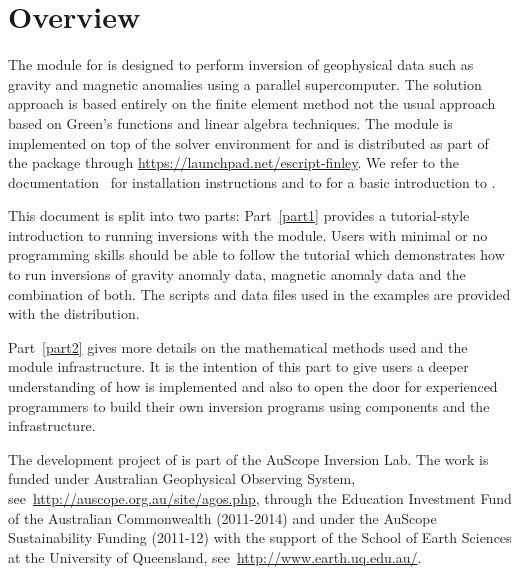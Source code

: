 
%
%
%


\chapter*{Overview}\label{sec:Intro}
The \downunder module for \Python is designed to perform inversion of
geophysical data such as gravity and magnetic anomalies using a parallel
supercomputer.
The solution approach is based entirely on the finite element method not the usual approach based on Green's functions
and linear algebra techniques.
The module is implemented on top of the \escript solver environment for
\Python and is distributed as part of the \escript package through
\url{https://launchpad.net/escript-finley}.
We refer to the \escript documentation~\cite{ESCRIPT} for installation
instructions and to \cite{ESCRIPTCOOKBOOK} for a basic introduction to \escript.

This document is split into two parts:
Part~\ref{part1} provides a tutorial-style introduction to running inversions
with the \downunder module.
Users with minimal or no programming skills should be able to follow the
tutorial which demonstrates how to run inversions of gravity anomaly data,
magnetic anomaly data and the combination of both.
The scripts and data files used in the examples are provided with the \escript
distribution.

Part~\ref{part2} gives more details on the mathematical methods used and the
module infrastructure.
It is the intention of this part to give users a deeper understanding of how
\downunder is implemented and also to open the door for experienced \Python
programmers to build their own inversion programs using \downunder components
and the \escript infrastructure. 

The development project of \downunder is part of the AuScope Inversion Lab. The work is funded 
under Australian Geophysical Observing System, 
see~\url{http://auscope.org.au/site/agos.php}, through the Education Investment Fund of
the Australian Commonwealth (2011-2014) and under the AuScope Sustainability Funding (2011-12)
with the support of the School of Earth Sciences at the University of Queensland, see~\url{http://www.earth.uq.edu.au/}.
